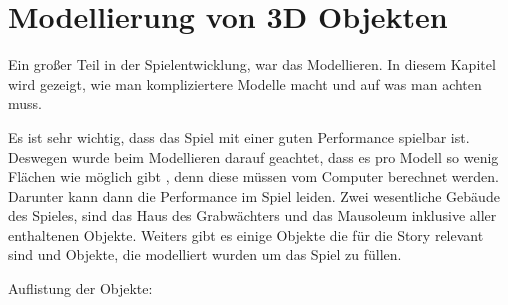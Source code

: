 \section{Modellierung von 3D Objekten}
\label{sec:Modellierung_von_3D_Objekten}
Ein großer Teil in der Spielentwicklung, war das Modellieren. In diesem Kapitel wird gezeigt, wie man kompliziertere
Modelle macht und auf was man achten muss.

Es ist sehr wichtig, dass das Spiel mit einer guten Performance spielbar ist. Deswegen wurde beim Modellieren darauf geachtet,
dass es pro Modell so wenig Flächen wie möglich gibt \citep{unreal:modellierungVon3dObjekten_performance}, denn diese müssen vom Computer berechnet werden.
Darunter kann dann die Performance im Spiel leiden.
Zwei wesentliche Gebäude des Spieles, sind das Haus des Grabwächters und das Mausoleum inklusive aller enthaltenen Objekte.
Weiters gibt es einige Objekte die für die Story relevant sind und Objekte, die modelliert wurden um das Spiel zu füllen.

Auflistung der Objekte:

